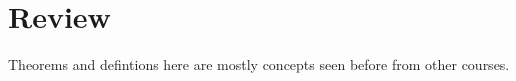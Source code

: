 \section*{Review}

Theorems and defintions here are mostly concepts seen before from other courses.


\clearpage


